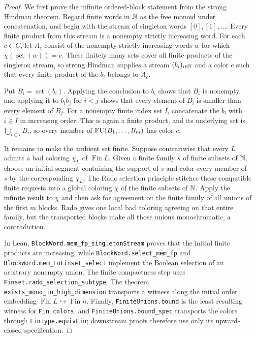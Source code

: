 \begin{proof}
We first prove the infinite ordered-block statement from the strong Hindman theorem.  Regard finite
words in $\mathbb{N}$ as the free monoid under concatenation, and begin with the stream of singleton words
$[0],[1],\ldots$.  Every finite product from this stream is a nonempty strictly increasing word.
For each $c\in C$, let $A_c$ consist of the nonempty strictly increasing words $w$ for which
$\chi(\operatorname{set}(w))=c$.  These finitely many sets cover all finite products of the
singleton stream, so strong Hindman supplies a stream $(b_i)_{i\in\mathbb{N}}$ and a color $c$ such that
every finite product of the $b_i$ belongs to $A_c$.

Put $B_i=\operatorname{set}(b_i)$.  Applying the conclusion to $b_i$ shows that $B_i$ is nonempty,
and applying it to $b_i b_j$ for $i<j$ shows that every element of $B_i$ is smaller than every
element of $B_j$.  For a nonempty finite index set $I$, concatenate the $b_i$ with $i\in I$ in
increasing order.  This is again a finite product, and its underlying set is
$\bigcup_{i\in I}B_i$, so every member of $\operatorname{FU}(B_1,\ldots,B_m)$ has color $c$.

It remains to make the ambient set finite.  Suppose contrariwise that every $L$ admits a bad
coloring $\chi_L$ of $\operatorname{Fin}L$.  Given a finite family $s$ of finite subsets of $\mathbb{N}$,
choose an initial segment containing the support of $s$ and color every member of $s$ by the
corresponding $\chi_L$.  The Rado selection principle stitches these compatible finite requests
into a global coloring $\chi$ of the finite subsets of $\mathbb{N}$.  Apply the infinite result to $\chi$
and then ask for agreement on the finite family of all unions of the first $m$ blocks.  Rado gives
one local bad coloring agreeing on that entire family, but the transported blocks make all those
unions monochromatic, a contradiction.

In Lean, \texttt{BlockWord.mem\_fp\_singletonStream} proves that the initial finite products are
increasing, while \texttt{BlockWord.select\_mem\_fp} and
\texttt{BlockWord.mem\_toFinset\_select} implement the Boolean selection of an arbitrary nonempty
union.  The finite compactness step uses \texttt{Finset.rado\_selection\_subtype}.
The theorem \texttt{exists\_mono\_in\_high\_dimension} transports a witness along the initial
order embedding $\operatorname{Fin}L\hookrightarrow\operatorname{Fin}n$.  Finally,
\texttt{FiniteUnions.bound} is the least resulting witness for \texttt{Fin colors}, and
\texttt{FiniteUnions.bound\_spec} transports the colors through
\texttt{Fintype.equivFin}; downstream proofs therefore use only its upward-closed specification.
\end{proof}


